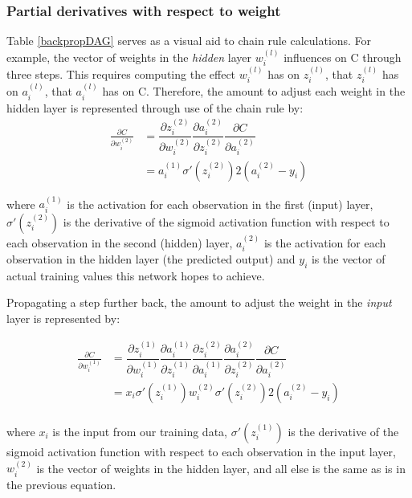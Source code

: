 \subsubsection{Partial derivatives with respect to
weight}

Table \ref{backpropDAG} serves as a visual aid to chain rule calculations.  For example, the vector of weights in the \textit{hidden} layer $w_i^{(l)}$ influences on C through three steps.  This requires computing the effect $w_i^{(l)}$ has on $z_i^{(l)}$, that $z_i^{(l)}$ has on $a_i^{(l)}$, that $a_i^{(l)}$ has on C.  
Therefore, the amount to adjust each weight in the hidden layer is
represented through use of the chain rule by:
\begin{align*}
\frac{\partial{C}}{\partial{w_i^{(2)}}}    &=  \dfrac{\partial{z_i^{(2)}}}{\partial{w_i^{(2)}}}
     \dfrac{\partial{a_i^{(2)}}}{\partial{z_i^{(2)}}}
     \dfrac{\partial{C}}{\partial{a_i^{(2)}}} \\ 
 &= a_i^{(1)} \sigma'(z_i^{(2)}) 2(a_i^{(2)}-y_i)
 \end{align*}

where \(a_i^{(1)}\) is the activation for each observation in the first
(input) layer, \(\sigma'(z_i^{(2)})\) is the derivative of the sigmoid
activation function with respect to each observation in the second
(hidden) layer, \(a_i^{(2)}\) is the activation for each observation in
the hidden layer (the predicted output) and \(y_i\) is the vector of actual training values
this network hopes to achieve.

Propagating a step further back, the amount to adjust the weight in the \emph{input} layer is
represented by:

    \begin{align*}
\frac{\partial{C}}{\partial{w_i^{(1)}}}    &= \dfrac{\partial{z_i^{(1)}}}{\partial{w_i^{(1)}}} \dfrac{\partial{a_i^{(1)}}}{\partial{z_i^{(1)}}}  \dfrac{\partial{z_i^{(2)}}}{\partial{a_i^{(1)}}}
     \dfrac{\partial{a_i^{(2)}}}{\partial{z_i^{(2)}}}
     \dfrac{\partial{C}}{\partial{a_i^{(2)}}} \\    
&= x_i \sigma'(z_i^{(1)}) w_i^{(2)} \sigma'(z_i^{(2)}) 2(a_i^{(2)}-y_i) \\
     \end{align*}

where \(x_i\) is the input from our training data,
\(\sigma'(z_i^{(1)})\) is the derivative of the sigmoid activation
function with respect to each observation in the input layer,
\(w_i^{(2)}\) is the vector of weights in the hidden layer, and all else
is the same as is in the previous equation.

